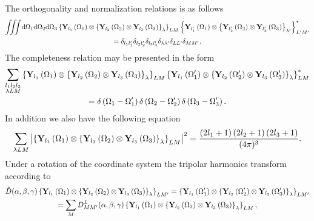The orthogonality and normalization relations is as follows
\begin{gather}
\iiint \mathrm{d} \Omega_{1} \mathrm{d} \Omega_{2} \mathrm{d} \Omega_{3}\left\{\mathbf{Y}_{l_{1}}\left(\Omega_{1}\right) \otimes\left\{\mathbf{Y}_{l_{2}}\left(\Omega_{2}\right) \otimes \mathbf{Y}_{l_{3}}\left(\Omega_{3}\right)\right\}_{\lambda}\right\}_{L M}\left\{\mathbf{Y}_{l_{1}^{\prime}}\left(\Omega_{1}\right) \otimes\left\{\mathbf{Y}_{l_{2}^{\prime}}\left(\Omega_{2}\right) \otimes \mathbf{Y}_{l_{3}^{\prime}}\left(\Omega_{3}\right)\right\}_{\lambda^{\prime}}\right\}_{L^{\prime} M^{\prime}}^{*}  \notag\\
=\delta_{l_{1} l_{1}^{\prime}} \delta_{l_{2} l_{2}^{\prime}} \delta_{l_{3} l_{3}^{\prime}} \delta_{\lambda \lambda^{\prime}} \delta_{L L^{\prime}} \delta_{M M^{\prime}}. \label{eq:5:16:12}
\end{gather}
The completeness relation may be presented in the form
\begin{gather}
\sum_{\substack{l_{1} l_{2} l_{3} \\
\lambda L M}}\left\{\mathbf{Y}_{l_{1}}\left(\Omega_{1}\right) \otimes\left\{\mathbf{Y}_{l_{2}}\left(\Omega_{2}\right) \otimes \mathbf{Y}_{l_{3}}\left(\Omega_{3}\right)\right\}_{\lambda}\right\}_{L M}\left\{\mathbf{Y}_{l_{1}}\left(\Omega_{1}^{\prime}\right) \otimes\left\{\mathbf{Y}_{l_{2}}\left(\Omega_{2}^{\prime}\right) \otimes \mathbf{Y}_{l_{3}}\left(\Omega_{3}^{\prime}\right)\right\}_{\lambda}\right\}_{L M}^{*}  \notag\\
=\delta\left(\Omega_{1}-\Omega_{1}^{\prime}\right) \delta\left(\Omega_{2}-\Omega_{2}^{\prime}\right) \delta\left(\Omega_{3}-\Omega_{3}^{\prime}\right). \label{eq:5:16:13}
\end{gather}
In addition we also have the following equation
\begin{equation}
\sum_{\lambda L M}\left|\left\{\mathbf{Y}_{l_{1}}\left(\Omega_{1}\right) \otimes\left\{\mathbf{Y}_{l_{2}}\left(\Omega_{2}\right) \otimes \mathbf{Y}_{l_{3}}\left(\Omega_{3}\right)\right\}_{\lambda}\right\}_{L M}\right|^{2}=\frac{\left(2 l_{1}+1\right)\left(2 l_{2}+1\right)\left(2 l_{3}+1\right)}{(4 \pi)^{3}}. \label{eq:5:16:14}
\end{equation}
Under a rotation of the coordinate system the tripolar harmonics transform according to
\begin{gather}
\hat{D}(\alpha, \beta, \gamma)\left\{\mathbf{Y}_{l_{1}}\left(\Omega_{1}\right) \otimes\left\{\mathbf{Y}_{l_{2}}\left(\Omega_{2}\right) \otimes \mathbf{Y}_{l_{3}}\left(\Omega_{3}\right)\right\}_{\lambda}\right\}_{L M^{\prime}}=\left\{\mathbf{Y}_{l_{1}}\left(\Omega_{1}^{\prime}\right) \otimes\left\{\mathbf{Y}_{l_{2}}\left(\Omega_{2}^{\prime}\right) \otimes \mathbf{Y}_{l_{3}}\left(\Omega_{3}^{\prime}\right)\right\}_{\lambda}\right\}_{L M^{\prime}}  \notag\\
=\sum_{M} D_{M M^{\prime}}^{L}(\alpha, \beta, \gamma)\left\{\mathbf{Y}_{l_{1}}\left(\Omega_{1}\right) \otimes\left\{\mathbf{Y}_{l_{2}}\left(\Omega_{2}\right) \otimes \mathbf{Y}_{l_{3}}\left(\Omega_{3}\right)\right\}_{\lambda}\right\}_{L M}, \label{eq:5:16:15}
\end{gather}
